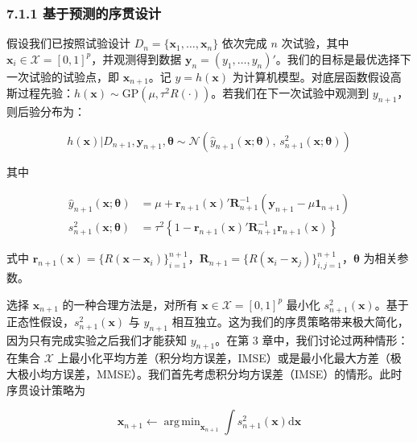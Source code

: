 \documentclass{ctexart}
\DeclareMathOperator*{\argmin}{arg\,min}
\begin{document}
\subsubsection*{7.1.1 基于预测的序贯设计}

假设我们已按照试验设计 $D_n=\{\boldsymbol{x}_1,\dots,\boldsymbol{x}_n\}$ 依次完成 $n$ 次试验，其中 $\boldsymbol{x}_i\in\mathcal{X}=[0,1]^p$，并观测得到数据 $\boldsymbol{y}_n=(y_1,\dots,y_n)'$。我们的目标是最优选择下一次试验的试验点，即 $\boldsymbol{x}_{n+1}$。记 $y=h(\boldsymbol{x})$ 为计算机模型。对底层函数假设高斯过程先验：$h(\boldsymbol{x})\sim\mathrm{GP}(\mu,\tau^2R(\cdot))$。若我们在下一次试验中观测到 $y_{n+1}$，则后验分布为：

\begin{equation*}
h(\boldsymbol{x})|D_{n+1},\boldsymbol{y}_{n+1},\boldsymbol{\theta}\sim\mathcal{N}\left(\widehat{y}_{n+1}(\boldsymbol{x};\boldsymbol{\theta}),\,s^2_{n+1}(\boldsymbol{x};\boldsymbol{\theta})\right)
\end{equation*}

其中

\begin{align*}
\widehat{y}_{n+1}(\boldsymbol{x};\boldsymbol{\theta})&=\mu+\boldsymbol{r}_{n+1}(\boldsymbol{x})'\boldsymbol{R}_{n+1}^{-1}(\boldsymbol{y}_{n+1}-\mu\boldsymbol{1}_{n+1})\\
s^2_{n+1}(\boldsymbol{x};\boldsymbol{\theta})&=\tau^2\left\{1-\boldsymbol{r}_{n+1}(\boldsymbol{x})'\boldsymbol{R}_{n+1}^{-1}\boldsymbol{r}_{n+1}(\boldsymbol{x})\right\}
\end{align*}

式中 $\boldsymbol{r}_{n+1}(\boldsymbol{x})=\{R(\boldsymbol{x}-\boldsymbol{x}_i)\}_{i=1}^{n+1}$，$\boldsymbol{R}_{n+1}=\{R(\boldsymbol{x}_i-\boldsymbol{x}_j)\}_{i,j=1}^{n+1}$，$\boldsymbol{\theta}$ 为相关参数。

选择 $\boldsymbol{x}_{n+1}$ 的一种合理方法是，对所有 $\boldsymbol{x}\in\mathcal{X}=[0,1]^p$ 最小化 $s^2_{n+1}(\boldsymbol{x})$。基于正态性假设，$s^2_{n+1}(\boldsymbol{x})$ 与 $y_{n+1}$ 相互独立。这为我们的序贯策略带来极大简化，因为只有完成实验之后我们才能获知 $y_{n+1}$。在第 3 章中，我们讨论过两种情形：在集合 $\mathcal{X}$ 上最小化平均方差（积分均方误差，IMSE）或是最小化最大方差（极大极小均方误差，MMSE）。我们首先考虑积分均方误差（IMSE）的情形。此时序贯设计策略为

\begin{equation*}
\boldsymbol{x}_{n+1}\leftarrow\argmin_{\boldsymbol{x}_{n+1}}\int s^2_{n+1}(\boldsymbol{x})\mathrm{d}\boldsymbol{x}
\tag{7.1}
\end{equation*}
\end{document}
